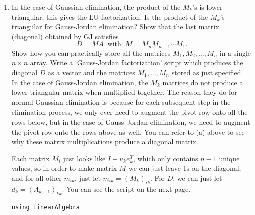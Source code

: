 \documentclass[11pt]{article}
\newcommand{\n}{\vspace{0.3cm}}
\begin{document}
\begin{enumerate}
\begin{enumerate}
\begin{proof}
\begin{align*}
\begin{array}{ccccccc}
						                    0           & 0           & \hdots & (A_k)_{k,k} & 0                   & \hdots & (A_k)_{k,n}     \\
						                    0           & 0           & \hdots & 0           & (A_k)_{(k+1),(k+1)} & \hdots & (A_k)_{(k+1),n} \\
						                    \vdots      & \vdots      & \ddots & \vdots      & \vdots              & \ddots & \vdots          \\
						                    0           & 0           & \hdots & 0           & 0                   & \hdots & (A_k)_{n,n}     \\
					                    \end{array}\right) \\
				            = A_{k+1}
			            \end{align*}
			            \normalsize Clearly the resultant matrix maintains the same characteristics as \(A_k\), but with another column zeroed out (except the pivot in position \((k+1,k+1)\)), so we can conclude that following the chain of steps mentioned above will finally terminate at \(A_n = D\) where \(D\) is diagonal.
		            \end{proof}

		      \item In the case of Gaussian elimination, the product of the \(M_k\)'s is lower-triangular, this gives the LU factorization.  Is the product of the \(M_k\)'s triangular for Gauss-Jordan elimination?  Show that the last matrix (diagonal) obtained by GJ satisfies
		            \[D = MA \;\; \text{with} \;\; M = M_n M_{n-1} \cdots M_1.\]
		            Show how you can practically store all the matrices \(M_1, M_2, \dots, M_n\) in a single \(n \times n\) array.  Write a `Gauss-Jordan factorization' script which produces the diagonal \(D\) as a vector and the matrices \(M_1, \dots, M_n\) stored as just specified. \n\\
		            In the case of Gauss-Jordan elimination, the \(M_k\) matrices do not produce a lower triangular matrix when multiplied together.  The reason they do for normal Gaussian elimination is because for each subsequent step in the elimination process, we only ever need to augment the pivot row onto all the rows below, but in the case of Gauss-Jordan elimination, we need to augment the pivot row onto the rows above as well.  You can refer to (a) above to see why these matrix multiplications produce a diagonal matrix. \n

		            Each matrix \(M_i\) just looks like \(I - u_ke_k^T\), which only contains \(n-1\) unique values, so in order to make matrix \(M\) we can just leave 1s on the diagonal, and for all other \(m_{ik}\), just let \(m_{ik} = (M_k)_{ik}\).  For \(D\), we can just let \(d_k = (A_{k-1})_{kk}\).  You can see the script on the next page.
		            \newpage
		            \begin{verbatim}
using LinearAlgebra


\end{verbatim}
\end{enumerate}
\end{enumerate}
\end{document}
